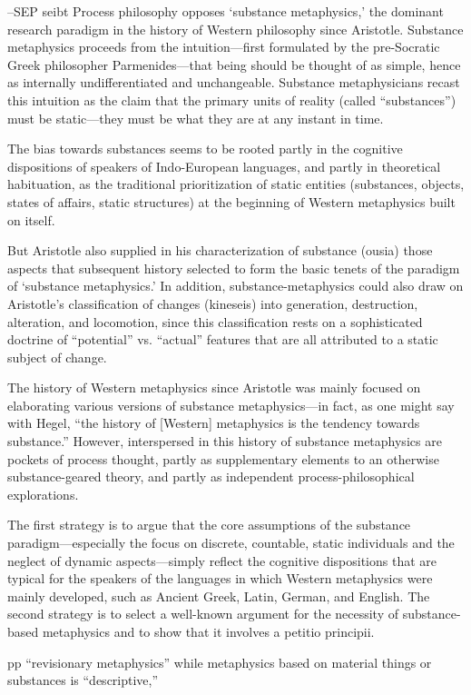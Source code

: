 --SEP seibt
Process philosophy opposes ‘substance metaphysics,’ the dominant research paradigm in the history of Western philosophy since Aristotle. Substance metaphysics proceeds from the intuition—first formulated by the pre-Socratic Greek philosopher Parmenides—that being should be thought of as simple, hence as internally undifferentiated and unchangeable. Substance metaphysicians recast this intuition as the claim that the primary units of reality (called “substances”) must be static—they must be what they are at any instant in time.


The bias towards substances seems to be rooted partly in the cognitive dispositions of speakers of Indo-European languages, and partly in theoretical habituation, as the traditional prioritization of static entities (substances, objects, states of affairs, static structures) at the beginning of Western metaphysics built on itself.

But Aristotle also supplied in his characterization of substance (ousia) those aspects that subsequent history selected to form the basic tenets of the paradigm of ‘substance metaphysics.’ In addition, substance-metaphysics could also draw on Aristotle's classification of changes (kineseis) into generation, destruction, alteration, and locomotion, since this classification rests on a sophisticated doctrine of “potential” vs. “actual” features that are all attributed to a static subject of change. 

The history of Western metaphysics since Aristotle was mainly focused on elaborating various versions of substance metaphysics—in fact, as one might say with Hegel, “the history of [Western] metaphysics is the tendency towards substance.” However, interspersed in this history of substance metaphysics are pockets of process thought, partly as supplementary elements to an otherwise substance-geared theory, and partly as independent process-philosophical explorations.

The first strategy is to argue that the core assumptions of the substance paradigm—especially the focus on discrete, countable, static individuals and the neglect of dynamic aspects—simply reflect the cognitive dispositions that are typical for the speakers of the languages in which Western metaphysics were mainly developed, such as Ancient Greek, Latin, German, and English. The second strategy is to select a well-known argument for the necessity of substance-based metaphysics and to show that it involves a petitio principii. 

pp “revisionary metaphysics” while metaphysics based on material things or substances is “descriptive,”

